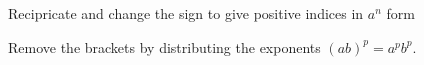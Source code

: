 \documentclass[12pt, a4paper, addpoints]{exam}
\newcommand{\ts}{\vspace{16mm}}
\begin{document}
\begin{questions}
\begin{multicols}{6}
\end{multicols}
\ts



\question Recipricate  and change the sign to give positive indices in $a^n$ form

\setlength{\columnsep}{20pt}
\begin{multicols}{6}
\end{multicols}
\ts


\newpage
\question Remove the brackets by distributing the exponents  \((ab)^p = a^p b^p\).

\setlength{\columnsep}{20pt}
\begin{multicols}{5}
\end{multicols}
\end{questions}
\end{document}
